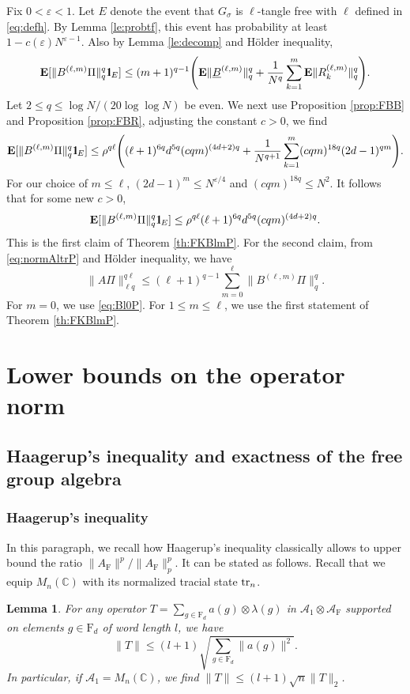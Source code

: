 \documentclass[11pt]{article}
\renewcommand{\star}{{\mathrm{F}}}
\newtheorem{lemma}{Lemma}[section]
\newcommand{\cA}{\mathcal{A}}
\newcommand{\tr}{{\rm tr}}
\newcommand{\dE}{\mathbf {E}}
\newcommand{\dF}{\mathrm{F}}
\newcommand{\dC}{\mathbb {C}}
\newcommand{\PAR}[1]{{{\left(#1\right)}}} %
\newcommand{\1}{1\!\!{\sf I}}
\newcommand{\IND}{\1}
\newcommand{\veps}{\varepsilon}
\begin{document}
Fix $0 < \veps < 1$. Let $E$ denote the event that $G_\sigma$ is $\ell$-tangle free with $\ell$ defined in \eqref{eq:defh}. By Lemma \ref{le:probtf}, this event has probability at least $1 - c(\veps) N^{\veps-1}$. Also by Lemma  \ref{le:decomp} and H\"older inequality,
$$
\dE [ \| B^{(\ell,m)} \Pi \|_q^q  \IND_{E} ] \leq (m+1)^{q-1} \PAR{ \dE \| \underline   B^{(\ell,m)} \|_q ^q + \frac{1}{N^q} \sum_{k=1}^m \dE \| R^{(\ell,m)}_k \|_q^q  }. 
$$
Let $2 \leq q \leq \log N / (20 \log \log N)$ be even.  We next use Proposition \ref{prop:FBB} and Proposition \ref{prop:FBR}, adjusting the constant $c >0$, we find
$$
\dE [ \| B^{(\ell,m)} \Pi \|_q^q  \IND_{E} ] \leq \rho^{q\ell} \PAR{ (\ell+1)^{6q}   d^{5q}  ( c qm)^{(4d +2)q}  + \frac{1}{N^{q+1}} \sum_{k=1}^m  (c qm)^{18 q} (2d-1)^{qm} }. 
$$
For our choice of $m\leq \ell$, $(2d-1)^{m} \leq N^{\veps/4}$ and $(cqm)^{18q} \leq N^2$. It follows that for some new $c >0$,
$$
\dE [ \| B^{(\ell,m)} \Pi \|_q^q  \IND_{E} ] \leq \rho^{q\ell}  (\ell+1)^{6q}   d^{5q}  ( c qm)^{(4d +2)q} . 
$$
This is the first claim of Theorem \ref{th:FKBlmP}. For the second claim, from \eqref{eq:normAltrP} and H\"older inequality, we have
$$
\| A \Pi\|_{\ell q }^{q \ell}  \leq (\ell+1)^{q-1} \sum_{m=0}^{\ell} \|  B^{(\ell,m)} \Pi \|^q_q.
$$
For $m=0$, we use \eqref{eq:Bl0P}. For $1 \leq m \leq \ell$, we use the first statement of Theorem \ref{th:FKBlmP}. 

\section{Lower bounds on the operator norm}


\subsection{Haagerup's inequality and exactness of the free group algebra}

\subsubsection{Haagerup's inequality}
\label{subsubsec:haagerup}
In this paragraph, we recall how Haagerup's inequality \cite[Lemma 1.4]{MR520930} classically allows to upper bound the ratio $ \| A _\star \|^p  /  \|A_\star\|_p ^p$. It can be stated as follows. Recall that we equip $M_n(\dC)$ with its normalized tracial state $\tr_n$. 

\begin{lemma}\label{le:Haagerup}
For any operator $T = \sum_{g \in \dF_d} a(g) \otimes \lambda(g)$ in $\cA_1 \otimes \cA_\star$ supported on elements $g \in \dF_d$ of word length $l$, we have
$$
\| T \| \leq (l+1) \sqrt{ \sum_{g \in \dF_d} \| a(g) \|^2}. 
$$
In particular, if $\cA _1 = M_n(\dC)$, we find $\| T \| \leq (l+1) \sqrt n \| T \|_2$. 

\end{lemma}
\end{document}
